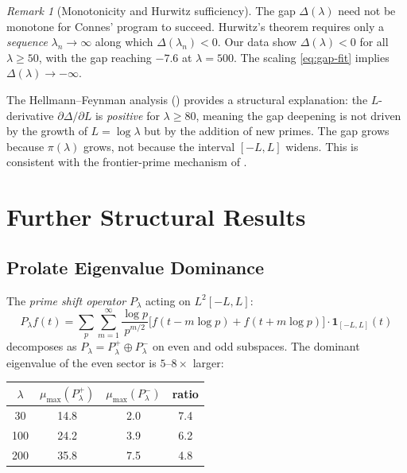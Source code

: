 \documentclass[12pt,a4paper]{article}
\theoremstyle{definition}
\theoremstyle{remark}
\newtheorem{remark}[theorem]{Remark}
\begin{document}
\begin{remark}[Monotonicity and Hurwitz sufficiency]
\label{rem:hurwitz}
The gap $\Delta(\lambda)$ need not be monotone for Connes' program to succeed. Hurwitz's theorem requires only a \emph{sequence} $\lambda_n \to \infty$ along which $\Delta(\lambda_n) < 0$. Our data show $\Delta(\lambda) < 0$ for all $\lambda \geq 50$, with the gap reaching $-7.6$ at $\lambda = 500$. The scaling \eqref{eq:gap-fit} implies $\Delta(\lambda) \to -\infty$.

The Hellmann--Feynman analysis () provides a structural explanation: the $L$-derivative $\partial\Delta/\partial L$ is \emph{positive} for $\lambda \geq 80$, meaning the gap deepening is not driven by the growth of $L = \log\lambda$ but by the addition of new primes. The gap grows because $\pi(\lambda)$ grows, not because the interval $[-L, L]$ widens. This is consistent with the frontier-prime mechanism of .
\end{remark}


\section{Further Structural Results}
\label{sec:further}

\subsection{Prolate Eigenvalue Dominance}

The \emph{prime shift operator} $P_\lambda$ acting on $L^2[-L, L]$:
\[ P_\lambda f(t) = \sum_p \sum_{m=1}^\infty \frac{\log p}{p^{m/2}} \bigl[f(t - m\log p) + f(t + m\log p)\bigr] \cdot \mathbf{1}_{[-L,L]}(t) \]
decomposes as $P_\lambda = P_\lambda^+ \oplus P_\lambda^-$ on even and odd subspaces. The dominant eigenvalue of the even sector is $5$--$8\times$ larger:

\begin{center}
\begin{tabular}{cccc}
$\lambda$ & $\mu_{\max}(P_\lambda^+)$ & $\mu_{\max}(P_\lambda^-)$ & ratio \\
\hline
30  & 14.8 &  2.0 & 7.4 \\
100 & 24.2 &  3.9 & 6.2 \\
200 & 35.8 &  7.5 & 4.8
\end{tabular}
\end{center}
\end{document}
